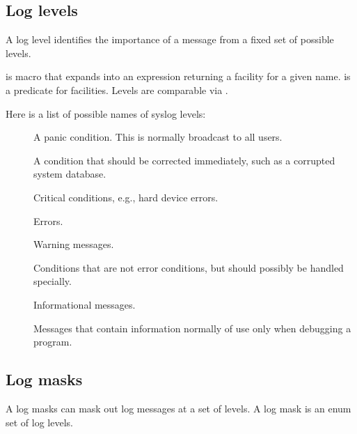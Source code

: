 \subsection*{Log levels}

A log level identifies the importance of a message from a fixed set
of possible levels.

\begin{protos}
\end{protos}
\noindent
{} is macro that expands into an expression returning
a facility for a given name.   is a predicate for
facilities.  Levels are comparable via .

Here is a list of possible names of syslog levels:

\begin{description}
\item[]
  A panic condition.  This is normally broadcast to all users.

\item[]
  A condition that should be corrected immediately, such as a
  corrupted system database.

\item[]
  Critical conditions, e.g., hard device errors.

\item[]
  Errors.

\item[]
  Warning messages.

\item[]
  Conditions that are not error conditions, but should possibly be
  handled specially.

\item[]
  Informational messages.

\item[]
  Messages that contain information normally of use only when
  debugging a program.
\end{description}

\subsection*{Log masks}

A log masks can mask out log messages at a set of levels.  A log
mask is an enum set of log levels.

